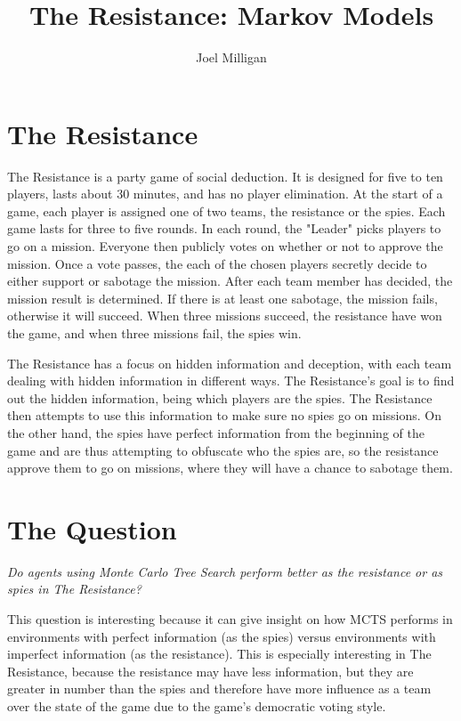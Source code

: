 \documentclass[a4paper]{article}
\title{The Resistance: Markov Models}
\author{Joel Milligan}
\begin{document}
\setcounter{tocdepth}{2}
\setcounter{secnumdepth}{2}

\maketitle
\tableofcontents

\newpage
\section{The Resistance}
The Resistance is a party game of social deduction.
It is designed for five to ten players, lasts about 30 minutes, and has no player elimination.
At the start of a game, each player is assigned one of two teams, the resistance or the spies.
Each game lasts for three to five rounds.
In each round, the "Leader" picks players to go on a mission.
Everyone then publicly votes on whether or not to approve the mission.
Once a vote passes, the each of the chosen players secretly decide to either support or sabotage the mission.
After each team member has decided, the mission result is determined.
If there is at least one sabotage, the mission fails, otherwise it will succeed.
When three missions succeed, the resistance have won the game, and when three missions fail, the spies win. \cite{BoardGameGeek}

The Resistance has a focus on hidden information and deception, with each team dealing with hidden information in different ways.
The Resistance's goal is to find out the hidden information, being which players are the spies. The Resistance then attempts to use this information to make sure no spies go on missions.
On the other hand, the spies have perfect information from the beginning of the game and are thus attempting to obfuscate who the spies are, so the resistance approve them to go on missions, where they will have a chance to sabotage them.

\section{The Question}
\emph{Do agents using Monte Carlo Tree Search perform better as the resistance or as spies in The Resistance?}

This question is interesting because it can give insight on how MCTS performs in environments with perfect information (as the spies) versus environments with imperfect information (as the resistance). This is especially interesting in The Resistance, because the resistance may have less information, but they are greater in number than the spies and therefore have more influence as a team over the state of the game due to the game's democratic voting style.
\end{document}
